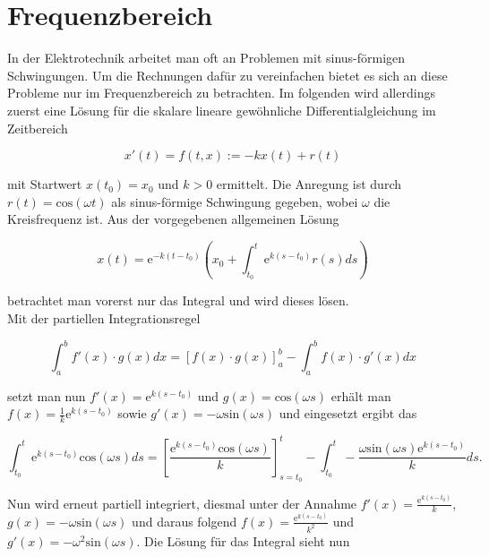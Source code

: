 \section{Frequenzbereich}\label{sec:ag3_2}

In der Elektrotechnik arbeitet man oft an Problemen mit sinus-förmigen Schwingungen. Um die Rechnungen dafür zu vereinfachen bietet es sich an diese Probleme nur im Frequenzbereich zu betrachten. 
Im folgenden wird allerdings zuerst eine Lösung für die skalare lineare gewöhnliche Differentialgleichung im Zeitbereich 

\begin{equation}
	x'(t) = f(t,x) := -kx(t) +r(t)
	\label{DGL}
\end{equation}

mit Startwert $x(t_0) = x_0$ und $k > 0$ ermittelt. Die Anregung ist durch $r(t) = \mathrm{cos}(\omega t)$ als sinus-förmige Schwingung gegeben, wobei $\omega$ die Kreisfrequenz ist.
Aus der vorgegebenen allgemeinen Lösung 

\begin{equation}
	x(t)=\mathrm{e}^{-k(t-t_0)} \left(x_0+\int_{t_0}^{t} \mathrm{e}^{k(s-t_0)}r(s)ds\right)
	\label{Ansatz}
\end{equation} 

betrachtet man vorerst nur das Integral und wird dieses lösen.\\
Mit der partiellen Integrationsregel 

\begin{equation*}
	\int_{a}^{b}f'(x) \cdot g(x)dx = \left[f(x) \cdot g(x)\right]^{b}_{a} - \int_{a}^{b} f(x) \cdot g'(x)dx
\end{equation*}

setzt man nun $f'(x)=\mathrm{e}^{k(s-t_0)}$ und $g(x)=\mathrm{cos}(\omega s)$ erhält man $f(x)=\frac{1}{k}\mathrm{e}^{k(s-t_0)}$ sowie $g'(x)=-\omega \mathrm{sin}(\omega s)$ und eingesetzt ergibt das 

\begin{equation*}
	\int_{t_0}^{t} \mathrm{e}^{k(s-t_0)}\mathrm{cos}(\omega s)ds = \left[ \frac{\mathrm{e}^{k(s-t_0)}\mathrm{cos}(\omega s)}{k} \right]^{t}_{s=t_0}-\int_{t_0}^{t}-\frac{\omega \mathrm{sin}(\omega s)\mathrm{e}^{k(s-t_0)}}{k} ds.
\end{equation*}

Nun wird erneut partiell integriert, diesmal unter der Annahme $f'(x)=\frac{\mathrm{e}^{k(s-t_0)}}{k}$, $g(x)=-\omega \mathrm{sin}(\omega s)$ und daraus folgend $f(x)=\frac{\mathrm{e}^{k(s-t_0)}}{k^2}$ und $g'(x)=-\omega^2 \mathrm{sin}(\omega s)$. Die Lösung für das Integral sieht nun 

